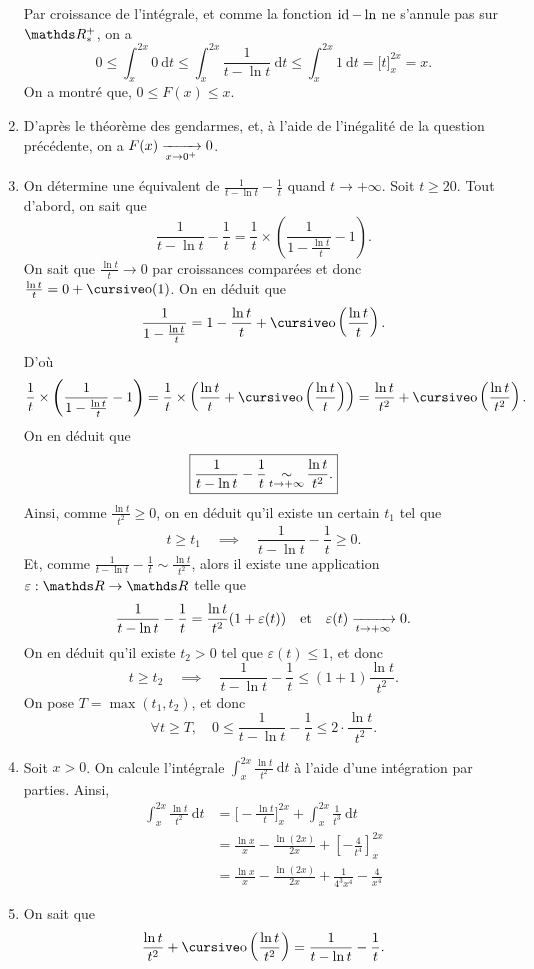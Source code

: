 \begin{enumerate}
		Par croissance de l'intégrale, et comme la fonction $\operatorname{id} - \ln$\/ ne s'annule pas sur $\R^+_*$, on a \[
			0 \le \int_{x}^{2x} 0~\mathrm{d}t \le \int_{x}^{2x} \frac{1}{t - \ln t}~\mathrm{d}t \le \int_{x}^{2x} 1~\mathrm{d}t = \big[t\big]_x^{2x} = x
		.\] On a montré que, $0 \le F(x) \le x$.
	\item D'après le théorème des gendarmes, et, à l'aide de l'inégalité de la question précédente, on a $F(x) \xrightarrow[x\to 0^+]{} 0$.
	\item On détermine une équivalent de $\frac{1}{t - \ln t} - \frac{1}{t}$ quand $t \to +\infty$. Soit $t \ge 20$. Tout d'abord, on sait que \[
			\frac{1}{t - \ln t} - \frac{1}{t} = \frac{1}{t} \times \left( \frac{1}{1 - \frac{\ln t}{t}} - 1 \right)
		.\] On sait que $\frac{\ln t}{t} \longrightarrow 0$\/ par croissances comparées et donc $\frac{\ln t}{t} = 0 + \po(1)$. On en déduit que \[
			\frac{1}{1 - \frac{\ln t}{t}} = 1 - \frac{\ln t}{t} + \po\left( \frac{\ln t}{t} \right)
		.\] D'où \[
			\frac{1}{t} \times \left( \frac{1}{1 - \frac{\ln t}{t}} - 1 \right) = \frac{1}{t} \times \left( \frac{\ln t}{t} + \po\left( \frac{\ln t}{t} \right) \right) = \frac{\ln t}{t^2} + \po\left( \frac{\ln t}{t^2} \right)
		.\] On en déduit que  \[
			\boxed{\frac{1}{t - \ln t} - \frac{1}{t} \operatorname*{\sim}_{t\to +\infty} \frac{\ln t}{t^2}.}
		\]
		Ainsi, comme $\frac{\ln t}{t^2} \ge 0$, on en déduit qu'il existe un certain $t_1$\/ tel que \[
			t \ge t_1 \quad\implies\quad \frac{1}{t-\ln t} - \frac{1}{t} \ge 0
		.\] Et, comme $\frac{1}{t - \ln t} - \frac{1}{t} \sim \frac{\ln t}{t^2}$, alors il existe une application $\varepsilon : \R \to \R$\/ telle que \[
			\frac{1}{t - \ln t} - \frac{1}{t} = \frac{\ln t}{t^2} (1 + \varepsilon(t)) \quad\text{et}\quad\varepsilon(t)\xrightarrow[t\to +\infty]{} 0
		.\] On en déduit qu'il existe $t_2 > 0$\/ tel que $\varepsilon(t) \le 1$, et donc \[
			t\ge t_2 \quad\implies\quad \frac{1}{t - \ln t} - \frac{1}{t} \le (1+1) \frac{\ln t}{t^2}
		.\] On pose $T = \max(t_1, t_2)$, et donc \[
			\boxed{\forall t \ge T,\quad 0\le \frac{1}{t - \ln t} - \frac{1}{t} \le 2\cdot \frac{\ln t}{t^2}.}
		\]
	\item Soit $x >0$. On calcule l'intégrale $\int_{x}^{2x} \frac{\ln t}{t^2}~\mathrm{d}t$\/ à l'aide d'une intégration par parties.
		Ainsi,
		\begin{align*}
			\int_{x}^{2x} \frac{\ln t}{t^2}~\mathrm{d}t &= \bigg[-\frac{\ln t}{t}\bigg]_x^{2x} + \int_{x}^{2x} \frac{1}{t^3}~\mathrm{d}t\\
			&= \frac{\ln x}{x} - \frac{\ln (2x)}{2x} + \left[ -\frac{4}{t^4} \right]_x^{2x}\\
			&= \frac{\ln x}{x} - \frac{\ln (2x)}{2x} + \frac{1}{4^3 x^4} - \frac{4}{x^4}
		\end{align*}
	\item On sait que \[
			\frac{\ln t}{t^2}  + \po\left( \frac{\ln t}{t^2} \right) = \frac{1}{t - \ln t} - \frac{1}{t}
		.\]
\end{enumerate}
